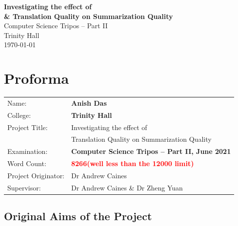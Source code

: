 \documentclass[12pt,a4paper,twoside,openright]{report}
\newcommand{\projectTitle}{Investigating the effect of \\
 & Translation Quality on Summarization Quality}                                        %
\begin{document}
 \renewcommand*{\thefootnote}{\arabic{footnote}}





\pagestyle{empty}


\vspace*{60mm}
\begin{center}
\Huge
\textbf{\projectTitle}\\[5mm]
Computer Science Tripos -- Part II\\[5mm]
Trinity Hall \\[5mm]
\today  %
\end{center}


\pagestyle{plain}

\chapter*{Proforma}

{\large
\begin{tabular}{ll}
Name:               & \bf Anish Das                      \\
College:            & \bf Trinity Hall                     \\
Project Title:      &  \projectTitle \\
Examination:        & \bf Computer Science Tripos -- Part II, June 2021  \\
Word Count:         & \bf \textcolor{red}{8266\footnotemark[1]
                      (well less than the 12000 limit)}  \\
Project Originator: & Dr Andrew Caines                  \\
Supervisor:         & Dr Andrew Caines \& Dr Zheng Yuan                   \\
\end{tabular}
}



\section*{Original Aims of the Project}
\end{document}
